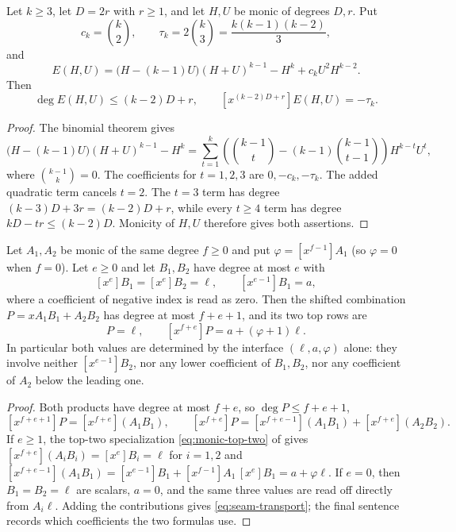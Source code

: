 \begin{lemma}
\label{lem:odd-T-cubic-loss}
Let $k\ge3$, let $D=2r$ with $r\ge1$, and let $H,U$ be monic of
degrees $D,r$.  Put
\[
  c_k=\binom{k}{2},\qquad \tau_k=2\binom{k}{3}
      =\frac{k(k-1)(k-2)}3,
\]
and
\[
  E(H,U)=\bigl(H-(k-1)U\bigr)(H+U)^{k-1}-H^k
          +c_kU^2H^{k-2}.
\]
Then
\[
  \deg E(H,U)\le (k-2)D+r,
  \qquad
  [x^{(k-2)D+r}]E(H,U)=-\tau_k.
\]
\end{lemma}
\begin{proof}
The binomial theorem gives
\[
  \bigl(H-(k-1)U\bigr)(H+U)^{k-1}-H^k
  =\sum_{t=1}^{k}
    \left(\binom{k-1}{t}-(k-1)\binom{k-1}{t-1}\right)
    H^{k-t}U^t,
\]
where $\binom{k-1}{k}=0$.  The coefficients for $t=1,2,3$ are
$0,-c_k,-\tau_k$.  The added quadratic term cancels $t=2$.
The $t=3$ term has degree $(k-3)D+3r=(k-2)D+r$, while every
$t\ge4$ term has degree $kD-tr\le(k-2)D$.  Monicity of $H,U$
therefore gives both assertions.
\end{proof}

\begin{lemma}
\label{lem:seam-transport}
Let $A_1,A_2$ be monic of the same degree $f\ge0$ and put
$\varphi=[x^{f-1}]A_1$ (so $\varphi=0$ when $f=0$).  Let $e\ge0$ and let
$B_1,B_2$ have degree at most $e$ with
\[
  [x^{e}]B_1=[x^{e}]B_2=\ell,\qquad [x^{e-1}]B_1=a,
\]
where a coefficient of negative index is read as zero.  Then the shifted
combination $P=xA_1B_1+A_2B_2$ has degree at most $f+e+1$, and its two top
rows are
\begin{equation}
  [x^{f+e+1}]P=\ell,\qquad
  [x^{f+e}]P=a+(\varphi+1)\ell.
  \tag{seam-transport}\label{eq:seam-transport}
\end{equation}
In particular both values are determined by the interface
$(\ell,a,\varphi)$ alone: they involve neither $[x^{e-1}]B_2$, nor any
lower coefficient of $B_1,B_2$, nor any coefficient of $A_2$ below the
leading one.
\end{lemma}
\begin{proof}
Both products have degree at most $f+e$, so $\deg P\le f+e+1$,
\[
  [x^{f+e+1}]P=[x^{f+e}](A_1B_1),
  \qquad
  [x^{f+e}]P=[x^{f+e-1}](A_1B_1)+[x^{f+e}](A_2B_2).
\]
If $e\ge1$, the top-two specialization \eqref{eq:monic-top-two} of
 gives $[x^{f+e}](A_iB_i)=[x^e]B_i=\ell$
for $i=1,2$ and
$[x^{f+e-1}](A_1B_1)=[x^{e-1}]B_1+[x^{f-1}]A_1\,[x^{e}]B_1=a+\varphi\ell$.
If $e=0$, then $B_1=B_2=\ell$ are scalars, $a=0$, and the same three
values are read off directly from $A_i\ell$.  Adding the contributions
gives \eqref{eq:seam-transport}; the final sentence records which
coefficients the two formulas use.
\end{proof}

